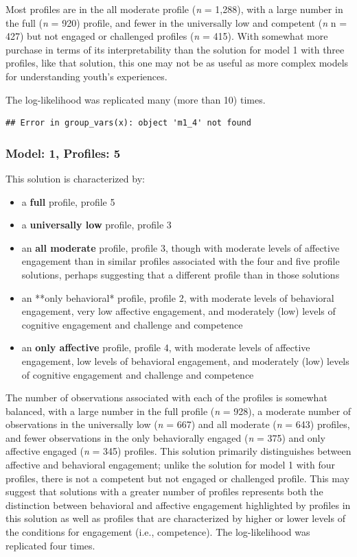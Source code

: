 \documentclass[]{book}
\providecommand{\tightlist}{%
  \setlength{\itemsep}{0pt}\setlength{\parskip}{0pt}}
\theoremstyle{definition}
\theoremstyle{definition}
\theoremstyle{definition}
\theoremstyle{remark}
\begin{document}
Most profiles are in the all moderate profile (\emph{n} = 1,288), with a
large number in the full (\emph{n} = 920) profile, and fewer in the
universally low and competent (\emph{n} n = 427) but not engaged or
challenged profiles (\emph{n} = 415). With somewhat more purchase in
terms of its interpretability than the solution for model 1 with three
profiles, like that solution, this one may not be as useful as more
complex models for understanding youth's experiences.

The log-likelihood was replicated many (more than 10) times.

\begin{verbatim}
## Error in group_vars(x): object 'm1_4' not found
\end{verbatim}

\subsubsection{Model: 1, Profiles: 5}\label{model-1-profiles-5}

This solution is characterized by:

\begin{itemize}
\tightlist
\item
  a \textbf{full} profile, profile 5
\item
  a \textbf{universally low} profile, profile 3
\item
  an \textbf{all moderate} profile, profile 3, though with moderate
  levels of affective engagement than in similar profiles associated
  with the four and five profile solutions, perhaps suggesting that a
  different profile than in those solutions
\item
  an **only behavioral* profile, profile 2, with moderate levels of
  behavioral engagement, very low affective engagement, and moderately
  (low) levels of cognitive engagement and challenge and competence
\item
  an \textbf{only affective} profile, profile 4, with moderate levels of
  affective engagement, low levels of behavioral engagement, and
  moderately (low) levels of cognitive engagement and challenge and
  competence
\end{itemize}

The number of observations associated with each of the profiles is
somewhat balanced, with a large number in the full profile (\emph{n} =
928), a moderate number of observations in the universally low (\emph{n}
= 667) and all moderate (\emph{n} = 643) profiles, and fewer
observations in the only behaviorally engaged (\emph{n} = 375) and only
affective engaged (\emph{n} = 345) profiles. This solution primarily
distinguishes between affective and behavioral engagement; unlike the
solution for model 1 with four profiles, there is not a competent but
not engaged or challenged profile. This may suggest that solutions with
a greater number of profiles represents both the distinction between
behavioral and affective engagement highlighted by profiles in this
solution as well as profiles that are characterized by higher or lower
levels of the conditions for engagement (i.e., competence). The
log-likelihood was replicated four times.
\end{document}
